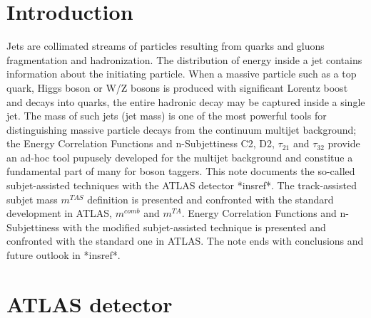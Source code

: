 \documentclass[UKenglish,texlive=2013]{\ATLASLATEXPATH atlasdoc}
\begin{document}
\maketitle

\tableofcontents


\section{Introduction}
\label{sec:intro}


Jets are collimated streams of particles resulting from quarks and gluons fragmentation and hadronization.
The distribution of energy inside a jet contains information about the initiating particle. When a massive
particle such as a top quark, Higgs boson or W/Z bosons is produced with significant Lorentz boost and decays into
quarks, the entire hadronic decay may be captured inside a single jet. The mass of such jets (jet mass)
is one of the most powerful tools for distinguishing massive particle decays from the continuum multijet
background; the Energy Correlation Functions and n-Subjettiness C2, D2, $\tau_{21}$ and $\tau_{32}$ provide an ad-hoc tool pupusely developed for the multijet background and constitue a fundamental part of many for boson taggers.
This note documents the so-called subjet-assisted techniques with the ATLAS detector *insref*. 
The track-assisted subjet mass $m^{TAS}$ definition is presented and confronted with the standard development in ATLAS, $m^{comb}$ and $m^{TA}$. 
Energy Correlation Functions and n-Subjettiness with the modified subjet-assisted technique is presented and confronted with the standard one in ATLAS.
The note ends with conclusions and future outlook in *insref*.


\section{ATLAS detector}
\label{sec:detector}
\end{document}
